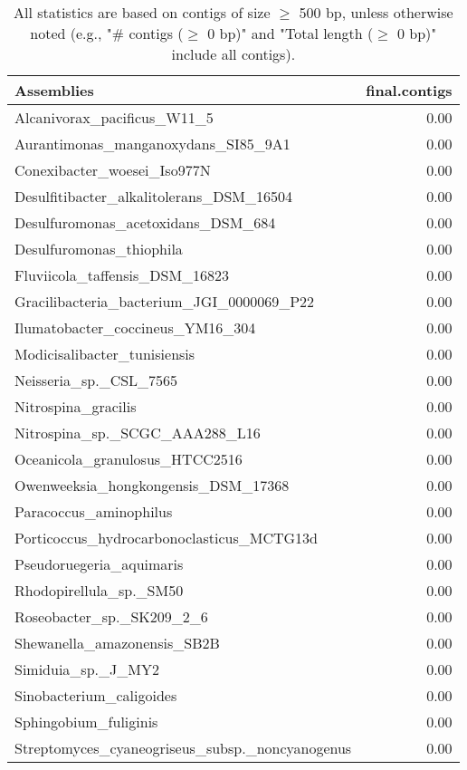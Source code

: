 \documentclass[12pt,a4paper]{article}
\begin{document}
\begin{table}[ht]
\begin{center}
\caption{All statistics are based on contigs of size $\geq$ 500 bp, unless otherwise noted (e.g., "\# contigs ($\geq$ 0 bp)" and "Total length ($\geq$ 0 bp)" include all contigs).}
\begin{tabular}{|l*{1}{|r}|}
\hline
Assemblies & final.contigs \\ \hline
Alcanivorax\_pacificus\_W11\_5 & 0.00 \\ \hline
Aurantimonas\_manganoxydans\_SI85\_9A1 & 0.00 \\ \hline
Conexibacter\_woesei\_Iso977N & 0.00 \\ \hline
Desulfitibacter\_alkalitolerans\_DSM\_16504 & 0.00 \\ \hline
Desulfuromonas\_acetoxidans\_DSM\_684 & 0.00 \\ \hline
Desulfuromonas\_thiophila & 0.00 \\ \hline
Fluviicola\_taffensis\_DSM\_16823 & 0.00 \\ \hline
Gracilibacteria\_bacterium\_JGI\_0000069\_P22 & 0.00 \\ \hline
Ilumatobacter\_coccineus\_YM16\_304 & 0.00 \\ \hline
Modicisalibacter\_tunisiensis & 0.00 \\ \hline
Neisseria\_sp.\_CSL\_7565 & 0.00 \\ \hline
Nitrospina\_gracilis & 0.00 \\ \hline
Nitrospina\_sp.\_SCGC\_AAA288\_L16 & 0.00 \\ \hline
Oceanicola\_granulosus\_HTCC2516 & 0.00 \\ \hline
Owenweeksia\_hongkongensis\_DSM\_17368 & 0.00 \\ \hline
Paracoccus\_aminophilus & 0.00 \\ \hline
Porticoccus\_hydrocarbonoclasticus\_MCTG13d & 0.00 \\ \hline
Pseudoruegeria\_aquimaris & 0.00 \\ \hline
Rhodopirellula\_sp.\_SM50 & 0.00 \\ \hline
Roseobacter\_sp.\_SK209\_2\_6 & 0.00 \\ \hline
Shewanella\_amazonensis\_SB2B & 0.00 \\ \hline
Simiduia\_sp.\_J\_MY2 & 0.00 \\ \hline
Sinobacterium\_caligoides & 0.00 \\ \hline
Sphingobium\_fuliginis & 0.00 \\ \hline
Streptomyces\_cyaneogriseus\_subsp.\_noncyanogenus & 0.00 \\ \hline

\end{tabular}
\end{center}
\end{table}
\end{document}
